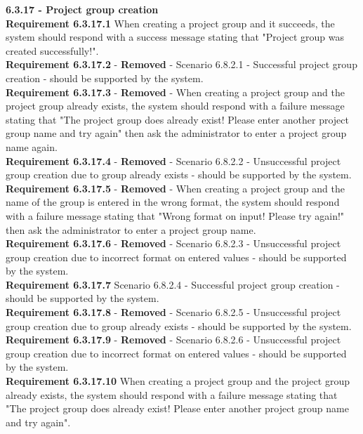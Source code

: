 \documentclass{article}
\begin{document}
{\fontsize{11}{11}\selectfont \noindent\textbf{6.3.17 - Project group creation}} \\
\textbf{Requirement 6.3.17.1} When creating a project group and it succeeds, the system should respond with a success message stating that "Project group was created successfully!". \\
\textbf{Requirement 6.3.17.2} - \textbf{Removed} - Scenario 6.8.2.1 - Successful project group creation - should be supported by the system. \\
\textbf{Requirement 6.3.17.3} - \textbf{Removed} - When creating a project group and the project group already exists, the system should respond with a failure message stating that "The project group does already exist! Please enter another project group name and try again" then ask the administrator to enter a project group name again. \\
\textbf{Requirement 6.3.17.4} - \textbf{Removed} - Scenario 6.8.2.2 - Unsuccessful project group creation due to group already exists - should be supported by the system. \\
\textbf{Requirement 6.3.17.5} - \textbf{Removed} - When creating a project group and the name of the group is entered in the wrong format, the system should respond with a failure message stating that "Wrong format on input! Please try again!" then ask the administrator to enter a project group name. \\
\textbf{Requirement 6.3.17.6} - \textbf{Removed} - Scenario 6.8.2.3 - Unsuccessful project group creation due to incorrect format on entered values - should be supported by the system. \\
\textbf{Requirement 6.3.17.7} Scenario 6.8.2.4 - Successful project group creation - should be supported by the system. \\
\textbf{Requirement 6.3.17.8} - \textbf{Removed} - Scenario 6.8.2.5 - Unsuccessful project group creation due to group already exists - should be supported by the system. \\
\textbf{Requirement 6.3.17.9} - \textbf{Removed} - Scenario 6.8.2.6 - Unsuccessful project group creation due to incorrect format on entered values - should be supported by the system. \\
\textbf{Requirement 6.3.17.10} When creating a project group and the project group already exists, the system should respond with a failure message stating that "The project group does already exist! Please enter another project group name and try again". \\
\end{document}

